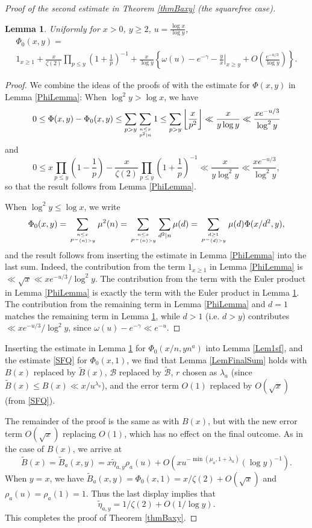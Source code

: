 \documentclass[11pt]{amsart}
\newtheorem{lemma}{Lemma}
\begin{document}
\begin{proof}[Proof of the second estimate in Theorem \ref{thmBaxy} (the squarefree case)]
\begin{lemma}\label{Phi0Lemma}
Uniformly for $x>0$, $y\ge 2$, $u=\frac{\log x}{\log y}$,
\begin{multline*}
\Phi_0(x,y) = \\ 1_{x\ge 1}+ \frac{x}{\zeta(2)} \prod_{p\le y}\left(1+\frac{1}{p}\right)^{-1} 
+\frac{x}{\log y} \left\{\omega(u)-e^{-\gamma} -\left.\frac{y}{x}\right|_{x\ge y} 
+ O\left(\frac{e^{-u/3}}{\log y}\right)\right\}.
\end{multline*}
\end{lemma}
\begin{proof}
We combine the ideas of the proofs of \cite[Lemmas 2.2 and 2.3]{PTW} with the estimate for $\Phi(x,y)$ in Lemma \ref{PhiLemma}:
When $\log^2 y > \log x$, we have
$$
0\le \Phi(x,y)-\Phi_0(x,y) \le \sum_{p>y}\sum_{n\le x \atop p^2|n}1 \le \sum_{p>y}\left\lfloor \frac{x}{p^2} \right\rfloor 
\ll \frac{x}{y \log y} \ll \frac{x e^{-u/3}}{\log^2 y}
$$
and
$$
0\le x \prod_{p\le y}\left(1-\frac{1}{p}\right) - \frac{x}{\zeta(2)} \prod_{p\le y}\left(1+\frac{1}{p}\right)^{-1} 
\ll \frac{x}{y \log^2 y} \ll \frac{x e^{-u/3}}{\log^2 y},
$$
so that the result follows from Lemma \ref{PhiLemma}.

When $\log^2 y \le \log x$, we write
$$
\Phi_0(x,y)=\sum_{n\le x \atop P^{-}(n) >y} \mu^2(n) = \sum_{n\le x \atop P^{-}(n)>y}\sum_{d^2|n}\mu(d) 
=\sum_{d\ge 1 \atop  P^{-}(d)>y}\mu(d) \Phi(x/d^2,y),
$$
and the result follows from inserting the estimate in Lemma \ref{PhiLemma} into the last sum. Indeed, the contribution from the term 
$1_{x\ge 1}$ in Lemma \ref{PhiLemma} is $\ll \sqrt{x} \ll x e^{-u/3}/\log^2 y$. 
The contribution from the term with the Euler product in  Lemma \ref{PhiLemma} is exactly the term with the Euler product in Lemma \ref{Phi0Lemma}.
The contribution from the remaining term in Lemma \ref{PhiLemma} and $d=1$ matches the remaining term in Lemma \ref{Phi0Lemma},
while $d>1$ (i.e. $d>y$) contributes $\ll  x e^{-u/3}/\log^2 y$, since $\omega(u)-e^{-\gamma} \ll e^{-u}$. 
\end{proof}

Inserting the estimate in Lemma \ref{Phi0Lemma} for $\Phi_0(x/n, y n^a)$ into Lemma \ref{Lem1sf}, and the estimate \eqref{SFQ} for
$\Phi_0(x,1)$, 
we find that Lemma \ref{LemFinalSum} holds with $B(x)$ replaced by $\tilde{B}(x)$, $\mathcal{B}$ replaced by $\tilde{\mathcal{B}}$, 
$r$ chosen as $\lambda_a$ (since $\tilde{B}(x) \le B(x) \ll x/u^{\lambda_a}$), and the error term $O(1)$ replaced by $O(\sqrt{x})$ (from \eqref{SFQ}). 

The remainder of the proof is the same as with $B(x)$, but with the new error term $O(\sqrt{x})$ replacing $O(1)$, which has no effect on the
final outcome. As in the case of $B(x)$, we arrive at
$$
\tilde{B}(x) = \tilde{B}_a(x,y) = x\tilde{\eta}_{a,y} \rho_a(u) + O(x u^ {-\min(\mu_a,1+\lambda_a) }(\log y)^{-1} ).
$$
When $y=x$, we have $\tilde{B}_a(x,y)= \Phi_0(x,1) = x/\zeta(2) +O(\sqrt{x})$ and $\rho_a(u)=\rho_a(1)=1$. Thus the last display implies that
$$
\tilde{\eta}_{a,y}=1/\zeta(2)+O(1/\log y).
$$
This completes the proof of Theorem \ref{thmBaxy}.
\end{proof}
\end{document}
